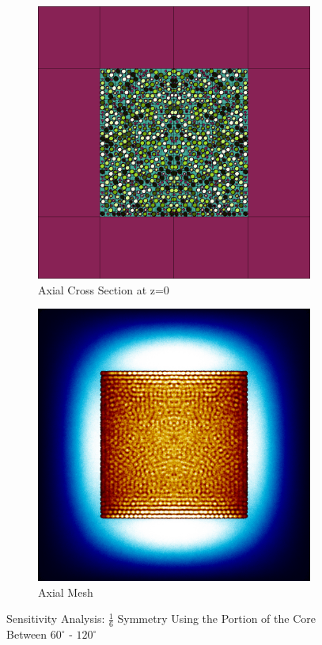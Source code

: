 \begin{figure}[H]
\begin{subfigure}{0.45\textwidth}
  \includegraphics[width=0.95\linewidth]{figures/60-120/60-120-v}
  \caption{Axial Cross Section at z=0 }
  \label{fig:60-120-v}
\end{subfigure}
%
\begin{subfigure}{0.45\textwidth}
  \includegraphics[width=0.95\linewidth]{figures/60-120/60-120-vm}
  \caption{Axial Mesh}
  \label{fig:60-120-vm}
\end{subfigure}
%
\caption{Sensitivity Analysis: $\frac{1}{6}$ Symmetry Using the Portion of the Core Between $60^{\circ}$ - $120^{\circ}$}
\label{fig:60-120}
\end{figure}